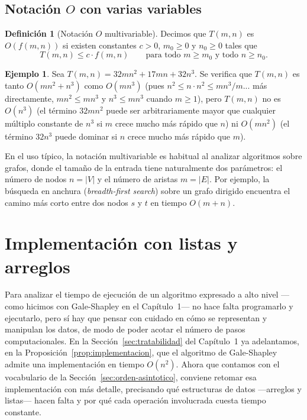 \documentclass[12pt, spanish, oneside, openany]{book}
\theoremstyle{uprightplain}
\theoremstyle{definition}
\newtheorem{definicion}[teorema]{Definición}
\newtheorem{ejemplo}[teorema]{Ejemplo}
\theoremstyle{remark}
\theoremstyle{definition}
\begin{document}
\subsection{Notación $O$ con varias variables}

\begin{definicion}[Notación $O$ multivariable]
\label{def:O-multivariable}
Decimos que $T(m,n)$ es $O(f(m,n))$ si existen constantes $c>0$, $m_0\ge 0$ y $n_0\ge 0$ tales que
\[
T(m,n) \le c\cdot f(m,n) \qquad \text{para todo } m\ge m_0 \text{ y todo } n\ge n_0.
\]
\end{definicion}

\begin{ejemplo}
Sea $T(m,n)=32mn^2+17mn+32n^3$. Se verifica que $T(m,n)$ es tanto $O(mn^2+n^3)$ como $O(mn^3)$ (pues $n^2\le n\cdot n^2\le mn^3/m$... más directamente, $mn^2\le mn^3$ y $n^3\le mn^3$ cuando $m\ge 1$), pero $T(m,n)$ no es $O(n^3)$ (el término $32mn^2$ puede ser arbitrariamente mayor que cualquier múltiplo constante de $n^3$ si $m$ crece mucho más rápido que $n$) ni $O(mn^2)$ (el término $32n^3$ puede dominar si $n$ crece mucho más rápido que $m$).
\end{ejemplo}

En el uso típico, la notación multivariable es habitual al analizar algoritmos sobre grafos, donde el tamaño de la entrada tiene naturalmente dos parámetros: el número de nodos $n=|V|$ y el número de aristas $m=|E|$. Por ejemplo, la búsqueda en anchura (\emph{breadth-first search}) sobre un grafo dirigido encuentra el camino más corto entre dos nodos $s$ y $t$ en tiempo $O(m+n)$.

\section{Implementación con listas y arreglos}
\label{sec:implementacion-listas-arreglos}

Para analizar el tiempo de ejecución de un algoritmo expresado a alto nivel —como hicimos con Gale-Shapley en el Capítulo~1— no hace falta programarlo y ejecutarlo, pero sí hay que pensar con cuidado en cómo se representan y manipulan los datos, de modo de poder acotar el número de pasos computacionales. En la Sección~\ref{sec:tratabilidad} del Capítulo~1 ya adelantamos, en la Proposición~\ref{prop:implementacion}, que el algoritmo de Gale-Shapley admite una implementación en tiempo $O(n^2)$. Ahora que contamos con el vocabulario de la Sección~\ref{sec:orden-asintotico}, conviene retomar esa implementación con más detalle, precisando qué estructuras de datos —arreglos y listas— hacen falta y por qué cada operación involucrada cuesta tiempo constante.
\end{document}
